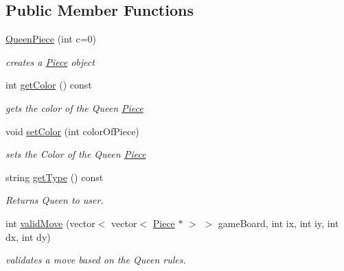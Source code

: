 \subsection*{Public Member Functions}
\begin{DoxyCompactItemize}
\item 
\hypertarget{classQueenPiece_a0eca088526b0b1a2648575fe867b3a9b}{
\hyperlink{classQueenPiece_a0eca088526b0b1a2648575fe867b3a9b}{QueenPiece} (int c=0)}
\label{classQueenPiece_a0eca088526b0b1a2648575fe867b3a9b}

\begin{DoxyCompactList}\small\item\em creates a \hyperlink{classPiece}{Piece} object \item\end{DoxyCompactList}\item 
int \hyperlink{classQueenPiece_a461d58f951b5e9f4d120cec0c47a1d9c}{getColor} () const 
\begin{DoxyCompactList}\small\item\em gets the color of the Queen \hyperlink{classPiece}{Piece} \item\end{DoxyCompactList}\item 
void \hyperlink{classQueenPiece_a691ff6afc7d167dab9cff0c910cae859}{setColor} (int colorOfPiece)
\begin{DoxyCompactList}\small\item\em sets the Color of the Queen \hyperlink{classPiece}{Piece} \item\end{DoxyCompactList}\item 
string \hyperlink{classQueenPiece_ae8df61c033b58d7f96e344166a9f2bdb}{getType} () const 
\begin{DoxyCompactList}\small\item\em Returns Queen to user. \item\end{DoxyCompactList}\item 
int \hyperlink{classQueenPiece_a5db59b743df799adc37ce6a3c0230458}{validMove} (vector$<$ vector$<$ \hyperlink{classPiece}{Piece} $\ast$ $>$ $>$ gameBoard, int ix, int iy, int dx, int dy)
\begin{DoxyCompactList}\small\item\em validates a move based on the Queen rules. \item\end{DoxyCompactList}\end{DoxyCompactItemize}


